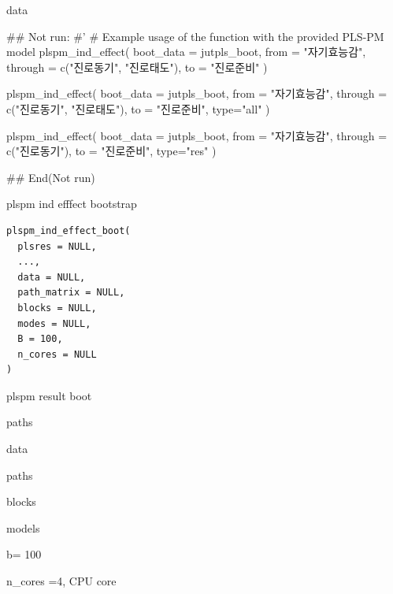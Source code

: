 \documentclass[a4paper]{book}
\begin{document}
%
\begin{Value}
data
\end{Value}
%
\begin{Examples}
\begin{ExampleCode}

\#\# Not run: 
#'
# Example usage of the function with the provided PLS-PM model
plspm_ind_effect(
  boot_data = jutpls_boot,
  from = "자기효능감",
  through = c("진로동기", "진로태도"),
  to = "진로준비"
)

plspm_ind_effect(
  boot_data = jutpls_boot,
  from = "자기효능감",
  through = c("진로동기", "진로태도"),
  to = "진로준비", type="all"
)

plspm_ind_effect(
  boot_data = jutpls_boot,
  from = "자기효능감",
  through = c("진로동기"),
  to = "진로준비", type="res"
)


## End(Not run)


\end{ExampleCode}
\end{Examples}
%
\begin{Description}
plspm ind efffect bootstrap
\end{Description}
%
\begin{Usage}
\begin{verbatim}
plspm_ind_effect_boot(
  plsres = NULL,
  ...,
  data = NULL,
  path_matrix = NULL,
  blocks = NULL,
  modes = NULL,
  B = 100,
  n_cores = NULL
)
\end{verbatim}
\end{Usage}
%
\begin{Arguments}
\begin{ldescription}
\item[\code{plsres}] plspm result boot

\item[\code{...}] paths

\item[\code{data}] data

\item[\code{path\_matrix}] paths

\item[\code{blocks}] blocks

\item[\code{modes}] models

\item[\code{B}] b= 100

\item[\code{n\_cores}] n\_cores =4, CPU core
\end{ldescription}
\end{Arguments}
\end{document}
